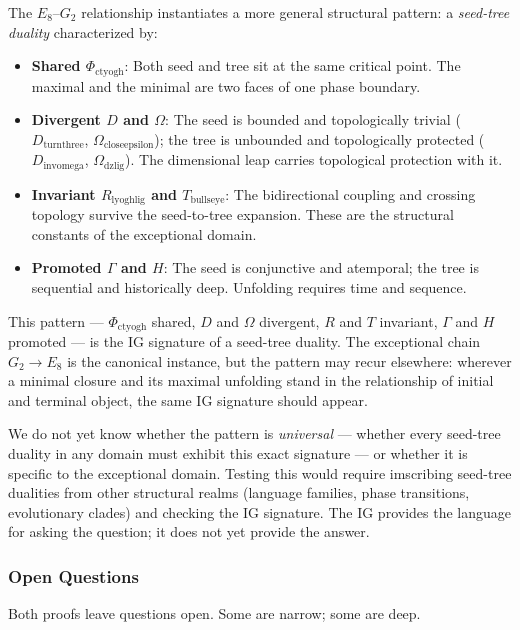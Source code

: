 \documentclass[12pt,a4paper]{article}
\begin{document}
The $E_8$--$G_2$ relationship instantiates a more general structural pattern: a \emph{seed-tree duality} characterized by:

\begin{itemize}
    \item \textbf{Shared $\Phi_{\text{ctyogh}}$}: Both seed and tree sit at the same critical point. The maximal and the minimal are two faces of one phase boundary.
    \item \textbf{Divergent $D$ and $\Omega$}: The seed is bounded and topologically trivial ($D_{\text{turnthree}}$, $\Omega_{\text{closeepsilon}}$); the tree is unbounded and topologically protected ($D_{\text{invomega}}$, $\Omega_{\text{dzlig}}$). The dimensional leap carries topological protection with it.
    \item \textbf{Invariant $R_{\text{lyoghlig}}$ and $T_{\text{bullseye}}$}: The bidirectional coupling and crossing topology survive the seed-to-tree expansion. These are the structural constants of the exceptional domain.
    \item \textbf{Promoted $\Gamma$ and $H$}: The seed is conjunctive and atemporal; the tree is sequential and historically deep. Unfolding requires time and sequence.
\end{itemize}

This pattern --- $\Phi_{\text{ctyogh}}$ shared, $D$ and $\Omega$ divergent, $R$ and $T$ invariant, $\Gamma$ and $H$ promoted --- is the IG signature of a seed-tree duality. The exceptional chain $G_2 \to E_8$ is the canonical instance, but the pattern may recur elsewhere: wherever a minimal closure and its maximal unfolding stand in the relationship of initial and terminal object, the same IG signature should appear.

We do not yet know whether the pattern is \emph{universal} --- whether every seed-tree duality in any domain must exhibit this exact signature --- or whether it is specific to the exceptional domain. Testing this would require imscribing seed-tree dualities from other structural realms (language families, phase transitions, evolutionary clades) and checking the IG signature. The IG provides the language for asking the question; it does not yet provide the answer.

\subsubsection{Open Questions}

Both proofs leave questions open. Some are narrow; some are deep.
\end{document}
